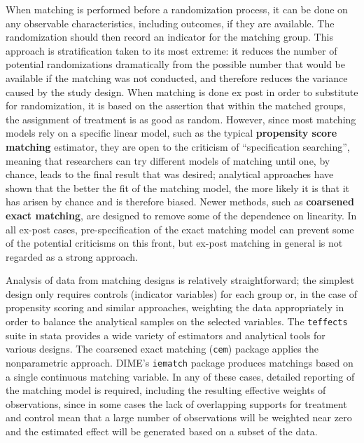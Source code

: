 When matching is performed before a randomization process,
it can be done on any observable characteristics,
including outcomes, if they are available.
The randomization should then record an indicator for the matching group.
This approach is stratification taken to its most extreme:
it reduces the number of potential randomizations dramatically
from the possible number that would be available
if the matching was not conducted,
and therefore reduces the variance caused by the study design.
When matching is done ex post in order to substitute for randomization,
it is based on the assertion that within the matched groups,
the assignment of treatment is as good as random.
However, since most matching models rely on a specific linear model,
such as the typical \textbf{propensity score matching} estimator,
they are open to the criticism of ``specification searching'',
meaning that researchers can try different models of matching
until one, by chance, leads to the final result that was desired;
analytical approaches have shown that the better the fit of the matching model,
the more likely it is that it has arisen by chance and is therefore biased.
Newer methods, such as \textbf{coarsened exact matching},\cite{iacus2012causal}
are designed to remove some of the dependence on linearity.
In all ex-post cases, pre-specification of the exact matching model
can prevent some of the potential criticisms on this front,
but ex-post matching in general is not regarded as a strong approach.

Analysis of data from matching designs is relatively straightforward;
the simplest design only requires controls (indicator variables) for each group
or, in the case of propensity scoring and similar approaches,
weighting the data appropriately in order to balance the analytical samples on the selected variables.
The \texttt{teffects} suite in stata provides a wide variety
of estimators and analytical tools for various designs.
The coarsened exact matching (\texttt{cem}) package applies the nonparametric approach.
DIME's \texttt{iematch} package produces matchings based on a single continuous matching variable.
In any of these cases, detailed reporting of the matching model is required,
including the resulting effective weights of observations,
since in some cases the lack of overlapping supports for treatment and control
mean that a large number of observations will be weighted near zero
and the estimated effect will be generated based on a subset of the data.

